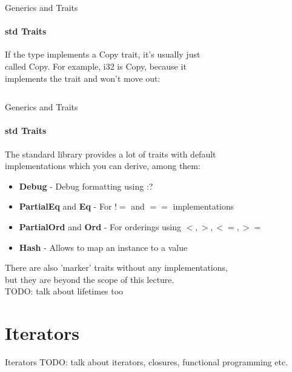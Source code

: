 \documentclass[usenames,dvipsnames,10pt,aspectratio=169]{beamer}
\begin{document}
\begin{frame}{Generics and Traits}
	\framesubtitle{std Traits}
	\large
	If the type implements a \textcolor{ucuyellow}{Copy} trait, it's usually just\\
	called Copy. For example, i32 is Copy, because it\\
	implements the trait and won't move out:\\
	\vspace{0.2cm}
	\inputminted[fontsize=\normalsize]{rust}{code/traits7.rs}
\end{frame}

\begin{frame}{Generics and Traits}
	\framesubtitle{std Traits}
	\large
	The standard library provides a lot of traits with default\\
	implementations which you can derive, among them:\\
	\vspace{0.2cm}
	\begin{itemize}[label=$\bullet$]
		\item \textbf{Debug} - Debug formatting using :?
		\item \textbf{PartialEq} and \textbf{Eq} - For $!=$ and $==$ implementations
		\item \textbf{PartialOrd} and \textbf{Ord} - For orderings using $<, >, <=, >=$
		\item \textbf{Hash} - Allows to map an instance to a value
	\end{itemize}
	\vspace{0.5cm}
	There are also 'marker' traits without any implementations,\\
	but they are beyond the scope of this lecture.\\
	\textcolor{ucured}{TODO: talk about lifetimes too}
\end{frame}


\section{Iterators}

\begin{frame}{Iterators}
	\large
	\textcolor{ucured}{TODO: talk about iterators, closures, functional programming etc.}
	
\end{frame}
 

\end{document}
